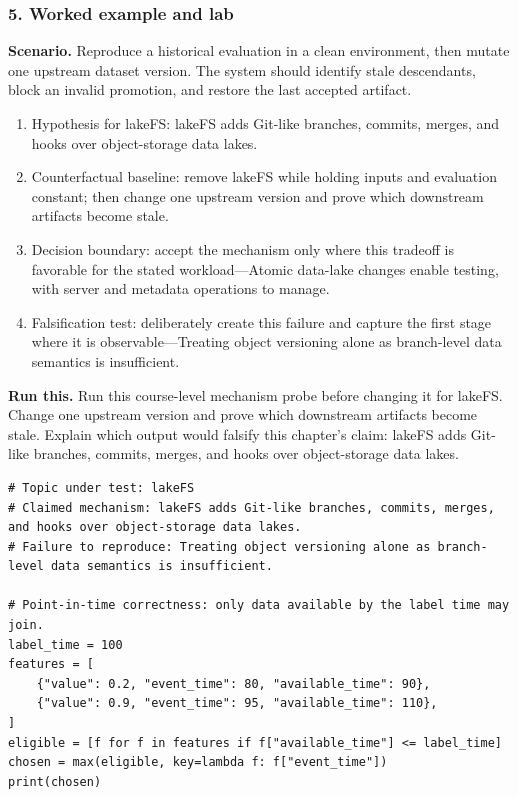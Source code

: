 \subsubsection*{5. Worked example and lab}
\textbf{Scenario.} Reproduce a historical evaluation in a clean environment, then mutate one upstream dataset version. The system should identify stale descendants, block an invalid promotion, and restore the last accepted artifact.
\begin{enumerate}
\item Hypothesis for lakeFS: lakeFS adds Git-like branches, commits, merges, and hooks over object-storage data lakes.
\item Counterfactual baseline: remove lakeFS while holding inputs and evaluation constant; then change one upstream version and prove which downstream artifacts become stale.
\item Decision boundary: accept the mechanism only where this tradeoff is favorable for the stated workload—Atomic data-lake changes enable testing, with server and metadata operations to manage.
\item Falsification test: deliberately create this failure and capture the first stage where it is observable—Treating object versioning alone as branch-level data semantics is insufficient.
\end{enumerate}
\textbf{Run this.} Run this course-level mechanism probe before changing it for lakeFS. Change one upstream version and prove which downstream artifacts become stale. Explain which output would falsify this chapter's claim: lakeFS adds Git-like branches, commits, merges, and hooks over object-storage data lakes.
\begin{Verbatim}[fontsize=\scriptsize]
# Topic under test: lakeFS
# Claimed mechanism: lakeFS adds Git-like branches, commits, merges, and hooks over object-storage data lakes.
# Failure to reproduce: Treating object versioning alone as branch-level data semantics is insufficient.

# Point-in-time correctness: only data available by the label time may join.
label_time = 100
features = [
    {"value": 0.2, "event_time": 80, "available_time": 90},
    {"value": 0.9, "event_time": 95, "available_time": 110},
]
eligible = [f for f in features if f["available_time"] <= label_time]
chosen = max(eligible, key=lambda f: f["event_time"])
print(chosen)
\end{Verbatim}
